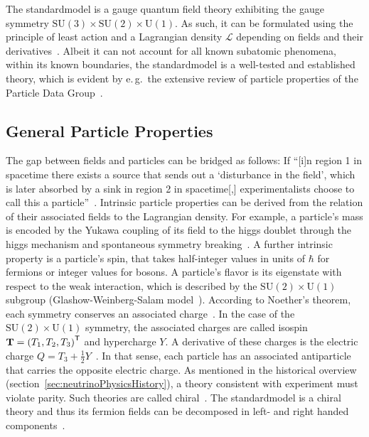 The \gls{standardmodel} is a gauge quantum field theory exhibiting the gauge symmetry $\text{SU}(3)\times\text{SU}(2)\times\text{U}(1)$. As such, it can be formulated using the principle of least action and a Lagrangian density $\mathcal{L}$ depending on fields and their derivatives~\cite{zee2003quantum}. Albeit it can not account for all known subatomic phenomena, within its known boundaries, the \gls{standardmodel} is a well-tested and established theory, which is evident by e.\,g.~the extensive review of particle properties of the Particle Data Group~\cite{ReviewOfParticlePhysics}.

\subsection{General Particle Properties}
\label{sec:neutrinoPhysicsStandardModelParticleProperties}
The gap between fields and particles can be bridged as follows: If ``[i]n region 1 in spacetime there exists a source that sends out a `disturbance in the field', which is later absorbed by a sink in region 2 in spacetime[,] experimentalists choose to call this a particle''~\cite{zee2003quantum}. Intrinsic particle properties can be derived from the relation of their associated fields to the Lagrangian density. For example, a particle's mass is encoded by the Yukawa coupling of its field to the higgs doublet through the higgs mechanism and spontaneous symmetry breaking~\cite{Higgs:1964pj}. A further intrinsic property is a particle's spin, that takes half-integer values in units of $\hbar$ for fermions or integer values for bosons. A particle's flavor is its eigenstate with respect to the weak interaction, which is described by the $\text{SU}(2)\times\text{U}(1)$ subgroup (Glashow-Weinberg-Salam model~\cite{Glashow:1961,Weinberg1967,Salam:1968}). According to Noether's theorem, each symmetry conserves an associated charge~\cite{Noether1918}. In the case of the $\text{SU}(2)\times\text{U}(1)$ symmetry, the associated charges are called isospin $\boldsymbol{\mathbf{T}}={(T_1, T_2, T_3)}^{\mathsf{T}}$ and hypercharge $Y$. A derivative of these charges is the electric charge $Q=T_3+\frac{1}{2}Y$~\cite{Wouter2019}. In that sense, each particle has an associated antiparticle that carries the opposite electric charge. As mentioned in the historical overview (section~\ref{sec:neutrinoPhysicsHistory}), a theory consistent with experiment must violate parity. Such theories are called chiral~\cite{zee2003quantum}. The \gls{standardmodel} is a chiral theory and thus its fermion fields can be decomposed in left- and right handed components~\cite{Wouter2019}. 

